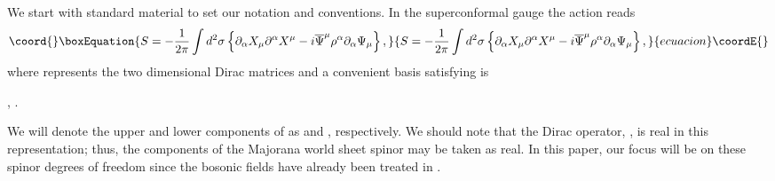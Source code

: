 \documentclass[a4paper,a4paper]{article}
\begin{document}
We start with standard material to set our notation and
conventions.  In the superconformal gauge the action reads
\begin{equation}\coord{}\boxEquation{
S=-\frac{1}{2\pi}\int
d^{2}\sigma\left\{\partial_{\alpha}X_{\mu}\partial^{\alpha}X^{\mu}-i\overline{\Psi}^{\mu}\rho^{\alpha}\partial_{\alpha}\Psi_{\mu}\right\},
}{
S=-\frac{1}{2\pi}\int
d^{2}\sigma\left\{\partial_{\alpha}X_{\mu}\partial^{\alpha}X^{\mu}-i\overline{\Psi}^{\mu}\rho^{\alpha}\partial_{\alpha}\Psi_{\mu}\right\},
}{ecuacion}\coordE{}\end{equation}
where \myHighlight{$\rho^{\alpha}$}\coordHE{} represents the two dimensional Dirac
matrices and a convenient basis satisfying
\myHighlight{$\left\{\rho^{\alpha},\rho^{\beta}\right\}=-2\eta^{\alpha\beta}$}\coordHE{}
is
\begin{center}
\coordHE{}, \coordHE{}.
\end{center}
We will denote the upper and lower components of \myHighlight{$\Psi$}\coordHE{} as
\myHighlight{$\Psi_{-}$}\coordHE{} and \myHighlight{$\Psi_{+}$}\coordHE{}, respectively.  We should note that the
Dirac operator, \coordHE{}, is real in this
representation; thus, the components of the Majorana world sheet
spinor may be taken as real. In this paper, our focus will be on
these spinor degrees of freedom since the bosonic fields have
already been treated in \cite{Gursoy}.
\end{document}
